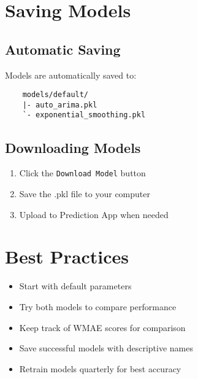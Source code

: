 \section{Saving Models}

\subsection{Automatic Saving}
Models are automatically saved to:
\begin{verbatim}
	models/default/
	|- auto_arima.pkl
	`- exponential_smoothing.pkl
\end{verbatim}

\subsection{Downloading Models}
\begin{enumerate}
	\item Click the \texttt{Download Model} button
	\item Save the .pkl file to your computer
	\item Upload to Prediction App when needed
\end{enumerate}

\section{Best Practices}

\begin{itemize}
	\item Start with default parameters
	\item Try both models to compare performance
	\item Keep track of WMAE scores for comparison
	\item Save successful models with descriptive names
	\item Retrain models quarterly for best accuracy
\end{itemize}